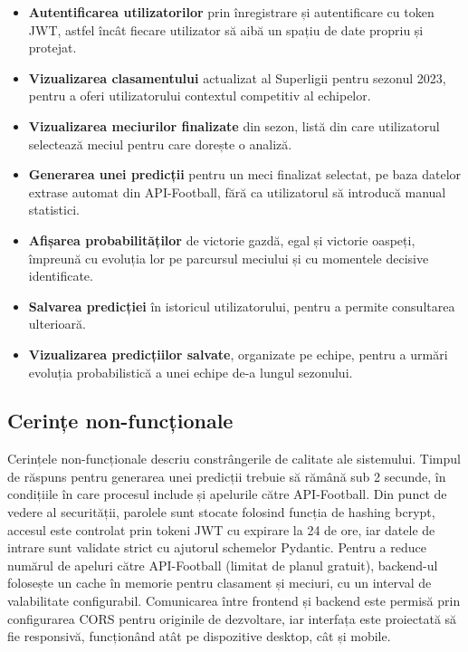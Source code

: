\begin{itemize}
    \item \textbf{Autentificarea utilizatorilor} prin înregistrare și
    autentificare cu token JWT, astfel încât fiecare utilizator să aibă un
    spațiu de date propriu și protejat.
    \item \textbf{Vizualizarea clasamentului} actualizat al Superligii
    pentru sezonul 2023, pentru a oferi utilizatorului contextul competitiv
    al echipelor.
    \item \textbf{Vizualizarea meciurilor finalizate} din sezon, listă din
    care utilizatorul selectează meciul pentru care dorește o analiză.
    \item \textbf{Generarea unei predicții} pentru un meci finalizat
    selectat, pe baza datelor extrase automat din API-Football, fără ca
    utilizatorul să introducă manual statistici.
    \item \textbf{Afișarea probabilităților} de victorie gazdă, egal și
    victorie oaspeți, împreună cu evoluția lor pe parcursul meciului și cu
    momentele decisive identificate.
    \item \textbf{Salvarea predicției} în istoricul utilizatorului, pentru a
    permite consultarea ulterioară.
    \item \textbf{Vizualizarea predicțiilor salvate}, organizate pe echipe,
    pentru a urmări evoluția probabilistică a unei echipe de-a lungul
    sezonului.
\end{itemize}

\subsection{Cerințe non-funcționale}

Cerințele non-funcționale descriu constrângerile de calitate ale
sistemului. Timpul de răspuns pentru generarea unei predicții trebuie să
rămână sub 2 secunde, în condițiile în care procesul include și apelurile
către API-Football. Din punct de vedere al securității, parolele sunt
stocate folosind funcția de hashing bcrypt, accesul este controlat prin
tokeni JWT cu expirare la 24 de ore, iar datele de intrare sunt validate
strict cu ajutorul schemelor Pydantic. Pentru a reduce numărul de apeluri
către API-Football (limitat de planul gratuit), backend-ul folosește un
cache în memorie pentru clasament și meciuri, cu un interval de valabilitate
configurabil. Comunicarea între frontend și backend este permisă prin
configurarea CORS pentru originile de dezvoltare, iar interfața este
proiectată să fie responsivă, funcționând atât pe dispozitive desktop, cât
și mobile.

